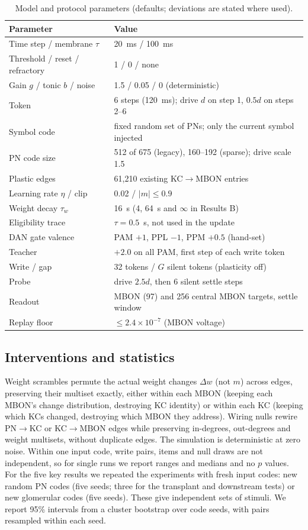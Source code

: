 \documentclass[conference]{IEEEtran}
\begin{document}
\begin{table}[t]
\caption{Model and protocol parameters (defaults; deviations are stated where
used).}
\label{tab:params}\centering\footnotesize\setlength{\tabcolsep}{3pt}
\begin{tabular}{@{}p{}p{}@{}}\toprule
Parameter & Value\\\midrule
Time step / membrane $\tau$ & 20~ms / 100~ms\\
Threshold / reset / refractory & 1 / 0 / none\\
Gain $g$ / tonic $b$ / noise & 1.5 / 0.05 / 0 (deterministic)\\
Token & 6 steps (120~ms); drive $d$ on step 1, $0.5d$ on steps 2--6\\
Symbol code & fixed random set of PNs; only the current symbol injected\\
PN code size & 512 of 675 (legacy), 160--192 (sparse); drive scale 1.5\\
Plastic edges & 61{,}210 existing KC$\rightarrow$MBON entries\\
Learning rate $\eta$ / clip & 0.02 / $|m|\le0.9$\\
Weight decay $\tau_w$ & 16~s (4, 64~s and $\infty$ in Results B)\\
Eligibility trace & $\tau=0.5$~s, not used in the update\\
DAN gate valence & PAM $+1$, PPL $-1$, PPM $+0.5$ (hand-set)\\
Teacher & $+2.0$ on all PAM, first step of each write token\\
Write / gap & 32 tokens / $G$ silent tokens (plasticity off)\\
Probe & drive $2.5d$, then 6 silent settle steps\\
Readout & MBON (97) and 256 central MBON targets, settle window\\
Replay floor & $\le2.4\times10^{-7}$ (MBON voltage)\\\bottomrule
\end{tabular}
\end{table}

\subsection{Interventions and statistics}
Weight scrambles permute the actual weight changes $\Delta w$ (not $m$) across
edges, preserving their multiset exactly, either within each MBON (keeping each
MBON's change distribution, destroying KC identity) or within each KC (keeping
which KCs changed, destroying which MBON they address). Wiring nulls rewire
PN$\rightarrow$KC or KC$\rightarrow$MBON edges while preserving in-degrees,
out-degrees and weight multisets, without duplicate edges. The simulation is
deterministic at zero noise. Within one input code, write pairs, items and
null draws are not independent, so for single runs we report ranges and
medians and no $p$ values. For the five key results we repeated the
experiments with fresh input codes: new random PN codes (five seeds; three
for the transplant and downstream tests) or new glomerular codes (five seeds).
These give independent sets of stimuli. We report 95\% intervals from a
cluster bootstrap over code seeds, with pairs resampled within each seed.
\end{document}
